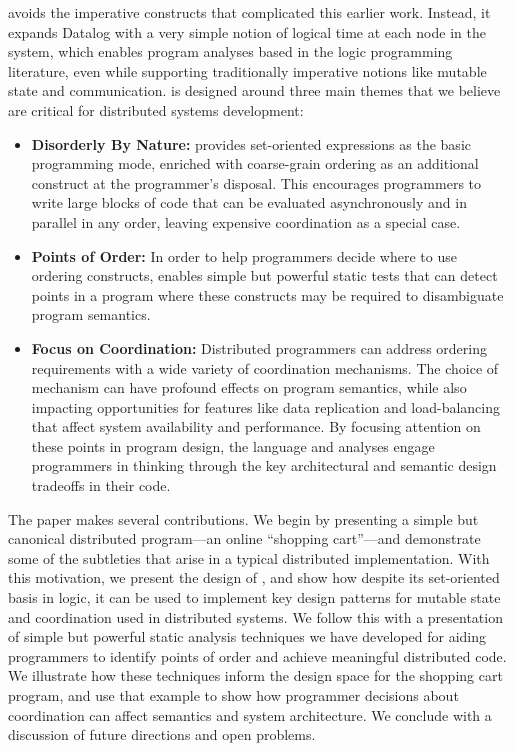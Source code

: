 \lang avoids the imperative constructs that complicated this earlier work.  Instead, it expands Datalog with a very simple notion of logical time at each node in the system, which enables program analyses based in the logic programming literature, even while supporting traditionally imperative notions like mutable state and communication.  \lang is designed around three main themes that we believe are critical for distributed systems development:
\begin{itemize}
    \item {\bf Disorderly By Nature:} \lang provides set-oriented expressions as the basic programming mode, enriched with coarse-grain ordering as an additional construct at the programmer's disposal.  This encourages programmers to write large blocks of code that can be evaluated asynchronously and in parallel in any order, leaving expensive coordination as a special case.
    \item {\bf Points of Order:} In order to help programmers decide where to use ordering constructs, \lang enables simple but powerful static tests that can detect points in a program where these constructs may be required to disambiguate program semantics. 
    \item {\bf Focus on Coordination:} Distributed programmers can address ordering requirements with a wide variety of coordination mechanisms. The choice of mechanism can have profound effects on program semantics, while also impacting opportunities for features like data replication and load-balancing that affect system availability and performance.  By focusing attention on these points in program design, the language and analyses engage programmers in thinking through the key architectural and semantic design tradeoffs in their code.
\end{itemize}

The paper makes several contributions.  We begin by presenting a simple but canonical distributed program---an online ``shopping cart''---and demonstrate some of the subtleties that arise in a typical distributed implementation.  With this motivation, we present the design of \lang, and show how despite its set-oriented basis in logic, it can be used to implement key design patterns for mutable state and coordination used in distributed systems.  We follow this with a presentation of simple but powerful static analysis techniques we have developed for aiding programmers to identify points of order and achieve meaningful  distributed code.  We illustrate how these techniques inform the design space for the shopping cart program, and use that example to show how programmer decisions about coordination can affect semantics and system architecture.  We conclude with a discussion of future directions and open problems.
